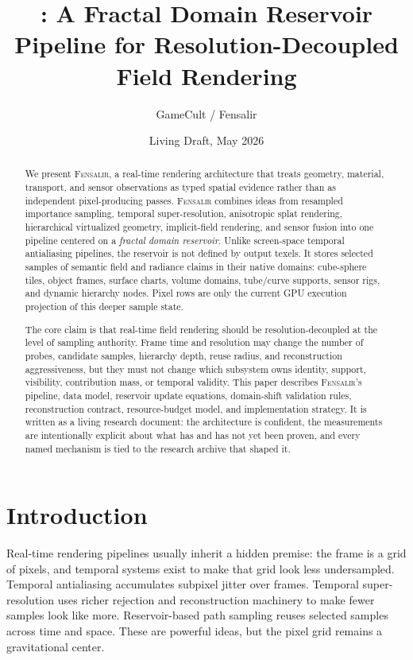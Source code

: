 \documentclass[11pt]{article}
\title{\Fensalir: A Fractal Domain Reservoir Pipeline for Resolution-Decoupled Field Rendering}
\author{GameCult / Fensalir}
\date{Living Draft, May 2026}
\newcommand{\Fensalir}{\textsc{Fensalir}}
\begin{document}
\maketitle

\begin{abstract}
We present \Fensalir, a real-time rendering architecture that treats geometry,
material, transport, and sensor observations as typed spatial evidence rather
than as independent pixel-producing passes.  \Fensalir{} combines ideas from
resampled importance sampling, temporal super-resolution, anisotropic splat
rendering, hierarchical virtualized geometry, implicit-field rendering, and
sensor fusion into one pipeline centered on a \emph{fractal domain reservoir}.
Unlike screen-space temporal antialiasing pipelines, the reservoir is not
defined by output texels.  It stores selected samples of semantic field and
radiance claims in their native domains: cube-sphere tiles, object frames,
surface charts, volume domains, tube/curve supports, sensor rigs, and dynamic
hierarchy nodes.  Pixel rows are only the current GPU execution projection of
this deeper sample state.

The core claim is that real-time field rendering should be resolution-decoupled
at the level of sampling authority.  Frame time and resolution may change the
number of probes, candidate samples, hierarchy depth, reuse radius, and
reconstruction aggressiveness, but they must not change which subsystem owns
identity, support, visibility, contribution mass, or temporal validity.  This
paper describes \Fensalir's pipeline, data model, reservoir update equations,
domain-shift validation rules, reconstruction contract, resource-budget model,
and implementation strategy.  It is written as a living research document: the
architecture is confident, the measurements are intentionally explicit about
what has and has not yet been proven, and every named mechanism is tied to the
research archive that shaped it.
\end{abstract}

\section{Introduction}

Real-time rendering pipelines usually inherit a hidden premise: the frame is a
grid of pixels, and temporal systems exist to make that grid look less
undersampled.  Temporal antialiasing accumulates subpixel jitter over frames.
Temporal super-resolution uses richer rejection and reconstruction machinery to
make fewer samples look like more.  Reservoir-based path sampling reuses
selected samples across time and space.  These are powerful ideas, but the
pixel grid remains a gravitational center.
\end{document}
